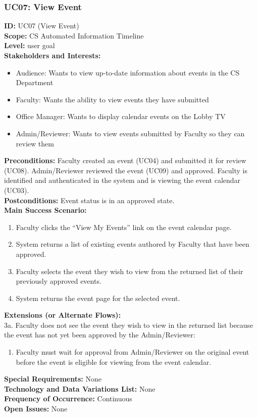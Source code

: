 \documentclass{article}
\begin{document}
\subsubsection{UC07: View Event}
\textbf{ID:} UC07 (View Event) \\
\textbf{Scope:} CS Automated Information Timeline \\
\textbf{Level:} user goal \\
\textbf{Stakeholders and Interests:}
\begin{itemize}
    \item Audience: Wants to view up-to-date information about events in the CS Department
    \item Faculty: Wants the ability to view events they have submitted
    \item Office Manager: Wants to display calendar events on the Lobby TV
    \item Admin/Reviewer: Wants to view events submitted by Faculty so they can review them
\end{itemize}
\textbf{Preconditions:} Faculty created an event (UC04) and submitted it for review (UC08). Admin/Reviewer reviewed the event (UC09) and approved. Faculty is identified and authenticated in the system and is viewing the event calendar (UC03). \\
\textbf{Postconditions:} Event status is in an approved state. \\
\textbf{Main Success Scenario:}
\begin{enumerate}
    \item Faculty clicks the “View My Events” link on the event calendar page.
    \item System returns a list of existing events authored by Faculty that have been approved.
    \item Faculty selects the event they wish to view from the returned list of their previously approved events.
    \item System returns the event page for the selected event.
\end{enumerate}
\textbf{Extensions (or Alternate Flows):} \\
3a. Faculty does not see the event they wish to view in the returned list because the event has not yet been approved by the Admin/Reviewer:
\begin{enumerate}
    \item Faculty must wait for approval from Admin/Reviewer on the original event before the event is eligible for viewing from the event calendar.
\end{enumerate}
\textbf{Special Requirements:} None \\
\textbf{Technology and Data Variations List:} None \\
\textbf{Frequency of Occurrence:} Continuous \\
\textbf{Open Issues:} None \\
\end{document}
